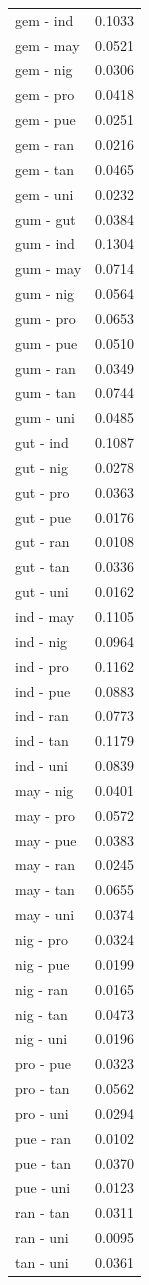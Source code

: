 \begin{tabular}{lr}
\addlinespace
gem - ind & 0.1033\\
gem - may & 0.0521\\
gem - nig & 0.0306\\
gem - pro & 0.0418\\
gem - pue & 0.0251\\
\addlinespace
gem - ran & 0.0216\\
gem - tan & 0.0465\\
gem - uni & 0.0232\\
gum - gut & 0.0384\\
gum - ind & 0.1304\\
\addlinespace
gum - may & 0.0714\\
gum - nig & 0.0564\\
gum - pro & 0.0653\\
gum - pue & 0.0510\\
gum - ran & 0.0349\\
\addlinespace
gum - tan & 0.0744\\
gum - uni & 0.0485\\
gut - ind & 0.1087\\
gut - nig & 0.0278\\
gut - pro & 0.0363\\
\addlinespace
gut - pue & 0.0176\\
gut - ran & 0.0108\\
gut - tan & 0.0336\\
gut - uni & 0.0162\\
ind - may & 0.1105\\
\addlinespace
ind - nig & 0.0964\\
ind - pro & 0.1162\\
ind - pue & 0.0883\\
ind - ran & 0.0773\\
ind - tan & 0.1179\\
\addlinespace
ind - uni & 0.0839\\
may - nig & 0.0401\\
may - pro & 0.0572\\
may - pue & 0.0383\\
may - ran & 0.0245\\
\addlinespace
may - tan & 0.0655\\
may - uni & 0.0374\\
nig - pro & 0.0324\\
nig - pue & 0.0199\\
nig - ran & 0.0165\\
\addlinespace
nig - tan & 0.0473\\
nig - uni & 0.0196\\
pro - pue & 0.0323\\
pro - tan & 0.0562\\
pro - uni & 0.0294\\
\addlinespace
pue - ran & 0.0102\\
pue - tan & 0.0370\\
pue - uni & 0.0123\\
ran - tan & 0.0311\\
ran - uni & 0.0095\\
\addlinespace
tan - uni & 0.0361\\
\bottomrule
\end{tabular}
